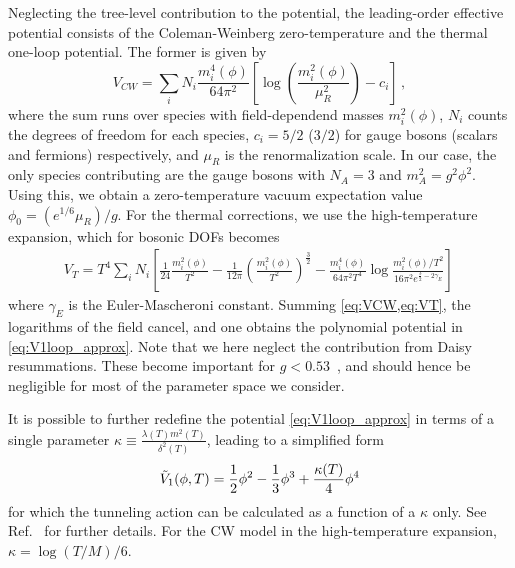 \documentclass{article}
\begin{document}
Neglecting the tree-level contribution to the potential, the leading-order effective potential consists of the Coleman-Weinberg zero-temperature and the thermal one-loop potential.
The former is given by~\cite{Coleman:1973jx}
\begin{equation}
    V_{CW} = \sum_{i} N_i \frac{m_i^4(\phi)}{64\pi^2}\left[\log\left(\frac{m_i^2(\phi)}{\mu_R^2}\right)-c_i\right] \,,
    \label{eq:VCW}
\end{equation}
where the sum runs over species with field-dependend masses $m_i^2(\phi)$, $N_i$ counts the degrees of freedom for each species, $c_i=5/2$ ($3/2$) for gauge bosons (scalars and fermions) respectively, and $\mu_R$ is the renormalization scale.
In our case, the only species contributing are the gauge bosons with $N_A = 3$ and $m_A^2 = g^2 \phi^2$.
Using this, we obtain a zero-temperature vacuum expectation value $\phi_0=(e^{1/6} \mu_R)/g$.
For the thermal corrections, we use the high-temperature expansion, which for bosonic DOFs becomes
\begin{align}
    V_T = T^4 \sum_i N_i \left[\frac{1}{24} \frac{m_i^2(\phi)}{T^2} - \frac{1}{12 \pi} \left(\frac{m_i^2(\phi)}{T^2}\right)^\frac{3}{2} - \frac{m_i^4(\phi)}{64 \pi^2 T^4} \log\frac{m_i^2(\phi)/T^2}{16 \pi^2 e^{\frac{3}{2}-2\gamma_E}} \right] \,
    \label{eq:VT}
\end{align}
where $\gamma_E$ is the Euler-Mascheroni constant. 
Summing \cref{eq:VCW,eq:VT}, the logarithms of the field cancel, and one obtains the polynomial potential in \cref{eq:V1loop_approx}.
Note that we here neglect the contribution from Daisy resummations.
These become important for $g<0.53$~\cite{Levi:2022bzt}, and should hence be negligible for most of the parameter space we consider.

It is possible to further redefine the potential \cref{eq:V1loop_approx} in terms of a single parameter $\kappa\equiv\frac{\lambda(T) m^2(T)}{\delta^2(T)}$, leading to a simplified form
\begin{equation}
    \label{eq:Vtilde}
    \Tilde{V}_1(\phi,T)= \frac{1}{2}\phi^2-\frac{1}{3}\phi^3+\frac{\kappa(T)}{4}\phi^4
\end{equation}
for which the tunneling action can be calculated as a function of a $\kappa$ only.
See Ref.~\cite{Levi:2022bzt} for further details.
For the CW model in the high-temperature expansion, $\kappa = \log(T/M)/6$.
\end{document}

